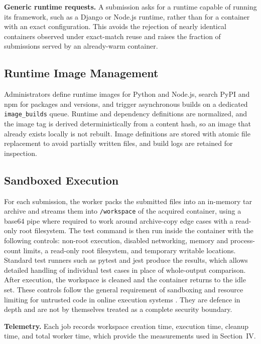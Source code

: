 \documentclass[conference]{IEEEtran}
\begin{document}
\textbf{Generic runtime requests.} A submission asks for a runtime capable of running its framework, such as a Django or Node.js runtime, rather than for a container with an exact configuration. This avoids the rejection of nearly identical containers observed under exact-match reuse \cite{suo2021} and raises the fraction of submissions served by an already-warm container.

\subsection{Runtime Image Management}
Administrators define runtime images for Python and Node.js, search PyPI and npm for packages and versions, and trigger asynchronous builds on a dedicated \texttt{image\_builds} queue. Runtime and dependency definitions are normalized, and the image tag is derived deterministically from a content hash, so an image that already exists locally is not rebuilt. Image definitions are stored with atomic file replacement to avoid partially written files, and build logs are retained for inspection.

\subsection{Sandboxed Execution}
For each submission, the worker packs the submitted files into an in-memory tar archive and streams them into \texttt{/workspace} of the acquired container, using a base64 pipe where required to work around archive-copy edge cases with a read-only root filesystem. The test command is then run inside the container with the following controls: non-root execution, disabled networking, memory and process-count limits, a read-only root filesystem, and temporary writable locations. Standard test runners such as pytest and jest produce the results, which allows detailed handling of individual test cases in place of whole-output comparison. After execution, the workspace is cleaned and the container returns to the idle set. These controls follow the general requirement of sandboxing and resource limiting for untrusted code in online execution systems \cite{dosilovic2020}. They are defence in depth and are not by themselves treated as a complete security boundary.

\textbf{Telemetry.} Each job records workspace creation time, execution time, cleanup time, and total worker time, which provide the measurements used in Section~IV.
\end{document}
